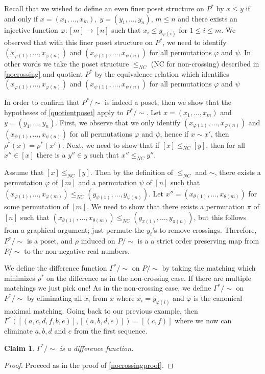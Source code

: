 \documentclass[acmsmall,review,anonymous]{acmart}\settopmatter{printfolios=true,printccs=false,printacmref=false}
\newtheorem{claim}{Claim}
\begin{document}
Recall that we wished to define an even finer poset structure on $P^*$ by $x
\leq y$ if and only if $x = (x_1, \ldots, x_m), \; y = (y_1, \ldots, y_n)$, $m
\leq n$ and there exists an injective function $\varphi : [m] \longrightarrow
[n]$ such that $x_i \leq y_{\varphi(i)}$ for $1 \leq i \leq m$. We observed
that with this finer poset structure on $P^*$, we need to identify
$(x_{\varphi(1)}, \ldots, x_{\varphi(n)})$ and $(x_{\psi(1)}, \ldots,
x_{\psi(n)})$ for all permutations $\varphi$ and $\psi$. In other words we take
the poset structure $\leq_{NC}$ (NC for non-crossing) described in
\cref{nocrossing} and quotient $P^*$ by the equivalence relation which
identifies $(x_{\varphi(1)}, \ldots, x_{\varphi(n)})$ and $(x_{\psi(1)},
\ldots, x_{\psi(n)})$ for all permutations $\varphi$ and $\psi$

In order to confirm that $P^*/{\sim}$ is indeed a poset, then we show that the
hypotheses of \cref{quotientposet} apply to $P^*/{\sim}$. Let $x=(x_1, \ldots,
x_m)$ and $y = (y_1, \ldots, y_n)$. First, we observe that we only identify
$(x_{\varphi(1)}, \ldots, x_{\varphi(n)})$ and $(x_{\psi(1)}, \ldots,
x_{\psi(n)})$ for all permutations $\varphi$ and $\psi$, hence if $x \sim x'$,
then $\rho^*(x) = \rho^*(x')$. Next, we need to show that if $[x] \leq_{NC}
[y]$, then for all $x'' \in [x]$ there is a $y'' \in y$ such that $x''
\leq_{NC} y''$.

Assume that $[x] \leq_{NC} [y]$. Then by the definition of $\leq_{NC}$ and
$\sim$, there exists a permutation $\varphi$ of $[m]$ and a permutation
$\psi$ of $[n]$ such that $(x_{\varphi(1)}, \ldots, x_{\varphi(m)}) \leq_{NC}
(y_{\psi(1)}, \ldots, y_{\psi(n)})$.  Let $x'' = (x_{\theta(1)}, \ldots,
x_{\theta(m)})$ for some permutation of $[m]$. We need to show that there
exists a permutation $\pi$ of $[n]$ such that $(x_{\theta(1)}, \ldots,
x_{\theta(m)}) \leq_{NC} (y_{\pi(1)}, \ldots, y_{\pi(n)})$, but this follows
from a graphical argument; just permute the $y_i$'s to remove crossings.
Therefore, $P^*/{\sim}$ is a poset, and $\rho$ induced on $P/{\sim}$ is a
a strict order preserving map from $P/{\sim}$ to the non-negative real numbers.

We define the difference function $\Gamma^*/{\sim}$ on $P/{\sim}$ by taking
the matching which minimizes $\rho^*$ on the difference as in the non-crossing
case. If there are multiple matchings we just pick one! As in the non-crossing
case, we define $\Gamma^*/{\sim}$ on $P^*/{\sim}$ by eliminating all $x_i$ from
$x$ where $x_i = y_{\varphi(i)}$ and $\varphi$ is the canonical maximal
matching. Going back to our previous example, then $ \Gamma^*([(a, c, d, f, b,
e)], [(a, b, d, e)]) = [(c, f)]$ where we now can eliminate $a, b, d$ and $e$
from the first sequence.
\begin{claim}
$\Gamma^*/{\sim}$ is a difference function.
\end{claim}
\begin{proof}
Proceed as in the proof of \cref{nocrossingproof}.
\end{proof}
\end{document}
